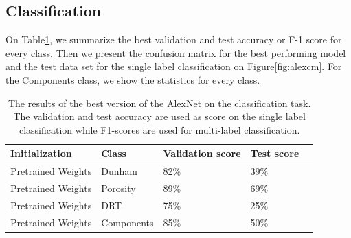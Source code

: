 \subsection{Classification}
On Table\ref{tab:alexbest}, we summarize the best validation and test accuracy or F-1 score for every class. Then we present the confusion matrix for the best performing model and the test data set for the single label classification on Figure\ref{fig:alexcm}. For the Components class, we show the statistics for every class. 

\begin{table}
\caption{\label{tab:alexbest} The results of the best version of the AlexNet on the classification task. The validation and test accuracy are used as score on the single label classification while F1-scores are used for multi-label classification.}
\centering
\begin{tabular}[b]{| l | l | l | l | l |}
\hline
    Initialization & Class & Validation score & Test score  \\ \hline
    Pretrained Weights & Dunham &  82\%  & 39\% \\ \hline
    Pretrained Weights & Porosity & 89\%  &  69\% \\ \hline
    Pretrained Weights &DRT & 75\% &  25\% \\ \hline
    Pretrained Weights &Components & 85\% &  50\% \\ \hline
\end{tabular} 
\end{table}

